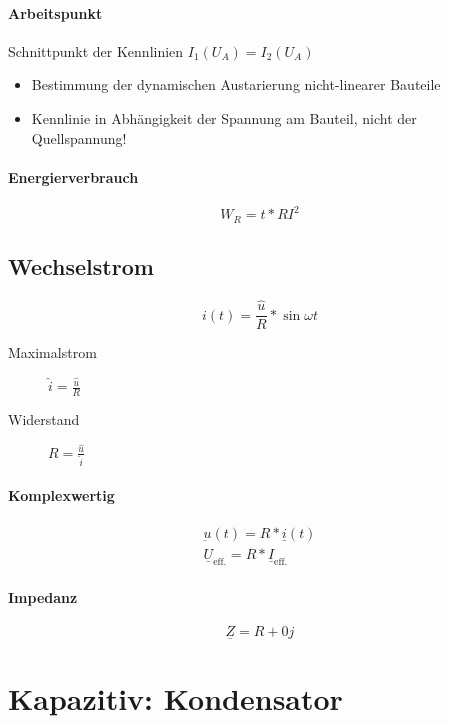 \paragraph{Arbeitspunkt} Schnittpunkt der Kennlinien $I_1 (U_A) = I_2 (U_A)$

\begin{itemize}
  \item Bestimmung der dynamischen Austarierung nicht-linearer Bauteile
  \item Kennlinie in Abhängigkeit der Spannung am Bauteil, nicht der Quellspannung!
\end{itemize}

\paragraph{Energierverbrauch}

$$W_R = t * RI^2$$

\subsection{Wechselstrom}

$$i(t) = \frac{\hat{u}}{R} * \sin \omega t$$

\begin{description}
  \item[Maximalstrom] $\hat{i} = \frac{\hat{u}}{R}$
  \item[Widerstand] $R = \frac{\hat{u}}{\hat{i}}$
\end{description}

\paragraph{Komplexwertig}

\begin{gather*}
  \underbar{u}(t) = R * \underline{i}(t) \\
  \underline{U}_\text{eff.} = R * \underline{I}_\text{eff.}
\end{gather*}

\paragraph{Impedanz}

$$\underline{Z} = R + 0j$$

\section{Kapazitiv: Kondensator}

